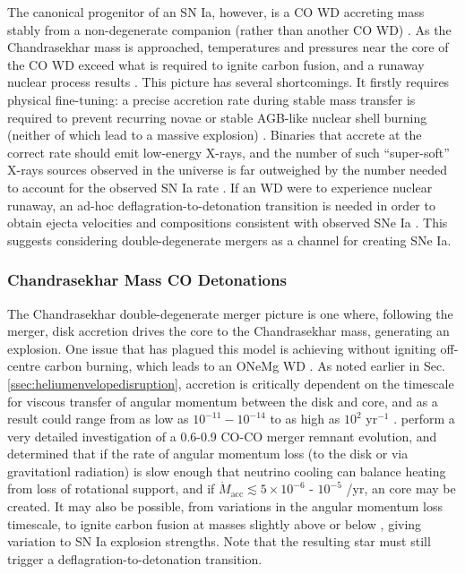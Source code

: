 The canonical progenitor of an SN Ia, however, is a CO WD accreting mass stably from a non-degenerate companion (rather than another CO WD) \citep{hilln00,howe10}.  As the Chandrasekhar mass {\Mchan} is approached, temperatures and pressures near the core of the CO WD exceed what is required to ignite carbon fusion, and a runaway nuclear process results \citep{hilln00,howe10}.  This picture has several shortcomings.  It firstly requires physical fine-tuning: a precise accretion rate during stable mass transfer is required to prevent recurring novae or stable AGB-like nuclear shell burning (neither of which lead to a massive explosion) \citep{vkercj10,howe10}.  Binaries that accrete at the correct rate should emit low-energy X-rays, and the number of such ``super-soft'' X-rays sources observed in the universe is far outweighed by the number needed to account for the observed SN Ia rate \citep{vkercj10,howe10}.  If an {\Mchan} WD were to experience nuclear runaway, an ad-hoc deflagration-to-detonation transition is needed in order to obtain ejecta velocities and compositions consistent with observed SNe Ia \citep{hilln00,howe10}.  This suggests considering double-degenerate mergers as a channel for creating SNe Ia.


\subsubsection{Chandrasekhar Mass CO Detonations}

The Chandrasekhar double-degenerate merger picture is one where, following the merger, disk accretion drives the core to the Chandrasekhar mass, generating an explosion.  One issue that has plagued this model is achieving {\Mchan} without igniting off-centre carbon burning, which leads to an ONeMg WD \cite{yoonpr07,loreig09}.  As noted earlier in Sec. \ref{ssec:heliumenvelopedisruption}, accretion is critically dependent on the timescale for viscous transfer of angular momentum between the disk and core, and as a result could range from as low as $10^{-11} - 10^{-14}$ to as high as $10^2$ {\Msun} yr$^{-1}$ \citep{loreig09}.  \citeauthor{yoonpr07} perform a very detailed investigation of a 0.6-0.9 {\Mchan} CO-CO merger remnant evolution, and determined that if the rate of angular momentum loss (to the disk or via gravitationl radiation) is slow enough that neutrino cooling can balance heating from loss of rotational support, and if $\dot{M}_\mathrm{acc} \lesssim 5 \times 10^{-6}$ - $10^{-5}$ {\Msun}/yr, an {\Mchan} core may be created.  It may also be possible, from variations in the angular momentum loss timescale, to ignite carbon fusion at masses slightly above or below {\Mchan}, giving variation to SN Ia explosion strengths.  Note that the resulting star must still trigger a deflagration-to-detonation transition.

